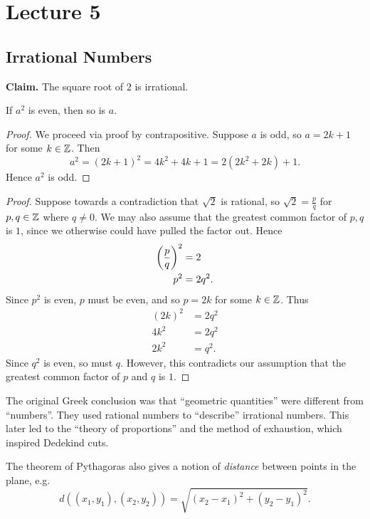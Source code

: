 \documentclass[class=article, crop=false]{standalone}
\begin{document}
  \section{Lecture 5}
  \subsection{Irrational Numbers}
  \textbf{Claim.} The square root of $2$ is irrational.
  \begin{lemma}{}
    If $a^2$ is even, then so is $a$.
    \begin{proof}
      We proceed via proof by contrapositive. Suppose $a$ is odd, so $a = 2k + 1$ for some $k\in\mathbb{Z}$. Then
      \[
        a^2 = (2k + 1)^2 = 4k^2 + 4k + 1 = 2(2k^2 + 2k) + 1.
      \]
      Hence $a^2$ is odd.
    \end{proof}
  \end{lemma}
  \begin{proof}
    Suppose towards a contradiction that $\sqrt{2}$ is rational, so $\sqrt{2} = \frac{p}{q}$ for $p, q\in\mathbb{Z}$ where $q\neq 0$. We may also assume that the greatest common factor of $p, q$ is $1$, since we otherwise could have pulled the factor out. Hence
    \begin{align*}
      \left( \frac{p}{q} \right)^2 &= 2 \\
      p^2 &= 2q^2.
    \end{align*}
    Since $p^2$ is even, $p$ must be even, and so $p = 2k$ for some $k\in\mathbb{Z}$. Thus
    \begin{align*}
      (2k)^2 &= 2q^2 \\
      4k^2 &= 2q^2 \\
      2k^2 &= q^2.
    \end{align*}
    Since $q^2$ is even, so must $q$. However, this contradicts our assumption that the greatest common factor of $p$ and $q$ is $1$.
  \end{proof}
  The original Greek conclusion was that ``geometric quantities'' were different from ``numbers''. They used rational numbers to ``describe'' irrational numbers. This later led to the ``theory of proportions'' and the method of exhaustion, which inspired Dedekind cuts.
  \begin{note}{}
    The theorem of Pythagoras also gives a notion of \emph{distance} between points in the plane, e.g.
    \[
      d((x_1, y_1), (x_2, y_2)) = \sqrt{(x_2 - x_1)^2 + (y_2 - y_1)^2}.
    \]
  \end{note}
\end{document}
